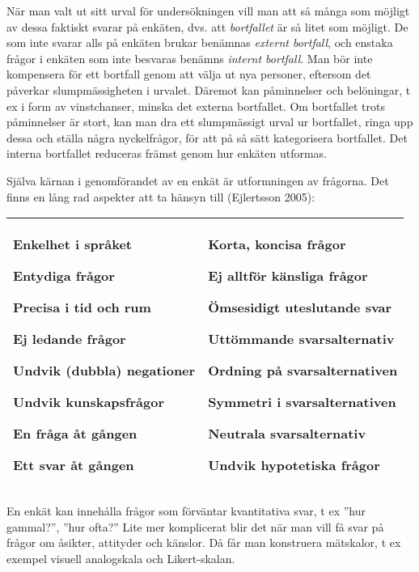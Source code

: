 När man valt ut sitt urval för undersökningen vill man att så många som
möjligt av dessa faktiskt svarar på enkäten, dvs. att \emph{bortfallet}
är så litet som möjligt. De som inte svarar alls på enkäten brukar
benämnas \emph{externt bortfall}, och enstaka frågor i enkäten som inte
besvaras benämns \emph{internt bortfall}. Man bör inte kompensera för
ett bortfall genom att välja ut nya personer, eftersom det påverkar
slumpmässigheten i urvalet. Däremot kan påminnelser och belöningar, t ex
i form av vinstchanser, minska det externa bortfallet. Om bortfallet
trots påminnelser är stort, kan man dra ett slumpmässigt urval ur
bortfallet, ringa upp dessa och ställa några nyckelfrågor, för att på så
sätt kategorisera bortfallet. Det interna bortfallet reduceras främst
genom hur enkäten utformas.

Själva kärnan i genomförandet av en enkät är utformningen av frågorna.
Det finns en lång rad aspekter att ta hänsyn till (Ejlertsson 2005):

\begin{longtable}[]{@{}ll@{}}
\toprule
\begin{minipage}[t]{0.48\columnwidth}\raggedright\strut
Enkelhet i språket

Entydiga frågor

Precisa i tid och rum

Ej ledande frågor

Undvik (dubbla) negationer

Undvik kunskapsfrågor

En fråga åt gången

Ett svar åt gången\strut
\end{minipage} & \begin{minipage}[t]{0.48\columnwidth}\raggedright\strut
Korta, koncisa frågor

Ej alltför känsliga frågor

Ömsesidigt uteslutande svar

Uttömmande svarsalternativ

Ordning på svarsalternativen

Symmetri i svarsalternativen

Neutrala svarsalternativ

Undvik hypotetiska frågor\strut
\end{minipage}\tabularnewline
\bottomrule
\end{longtable}

En enkät kan innehålla frågor som förväntar kvantitativa svar, t ex
''hur gammal?'', ''hur ofta?'' Lite mer komplicerat blir det när man
vill få svar på frågor om åsikter, attityder och känslor. Då får man
konstruera mätskalor, t ex exempel visuell analogskala och
Likert-skalan.


